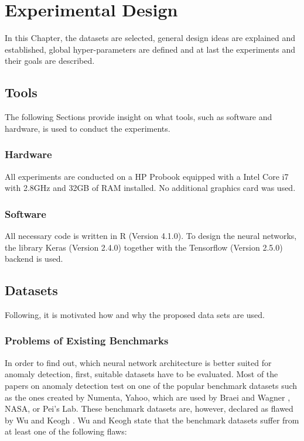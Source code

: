 \chapter{Experimental Design} \label{ExpDesign}
In this Chapter, the datasets are selected, general design ideas are explained and established, global hyper-parameters are defined and at last the experiments and their goals are described.

\section{Tools}
The following Sections provide insight on what tools, such as software and hardware, is used to conduct the experiments.

\subsection{Hardware}
All experiments are conducted on a HP Probook equipped with a Intel Core i7 with 2.8GHz and 32GB of RAM installed. No additional graphics card was used.

\subsection{Software}
All necessary code is written in R (Version 4.1.0). To design the neural networks, the library Keras (Version 2.4.0) together with the Tensorflow (Version 2.5.0) backend is used.


\section{Datasets}
Following, it is motivated how and why the proposed data sets are used.

\subsection{Problems of Existing Benchmarks} \label{Problems of Existing Benchmarks}
In order to find out, which neural network architecture is better suited for anomaly detection, first, suitable datasets have to be evaluated. Most of the papers on anomaly detection test on one of the popular benchmark datasets such as the ones created by Numenta, Yahoo,  which are used by Braei and Wagner \parencite{Braei2020}, NASA, or Pei's Lab. These benchmark datasets are, however, declared as flawed by Wu and Keogh \parencite*{Wu2020}. Wu and Keogh \parencite*{Wu2020} state that the benchmark datasets suffer from at least one of the following flaws:

